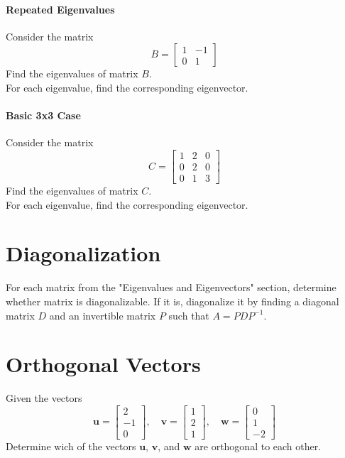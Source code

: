 \documentclass[]{article}
\begin{document}
	\paragraph{Repeated Eigenvalues}
	Consider the matrix
	$$B = \begin{bmatrix}
		1 & -1 \\
		0 & 1
	\end{bmatrix}$$
	Find the eigenvalues of matrix $B$.\\
	For each eigenvalue, find the corresponding eigenvector.
	
	\paragraph{Basic 3x3 Case}
	Consider the matrix
	$$C = \begin{bmatrix}
		1 & 2 & 0 \\
		0 & 2 & 0 \\
		0 & 1 & 3
	\end{bmatrix}$$
	Find the eigenvalues of matrix $C$.\\
	For each eigenvalue, find the corresponding eigenvector.
	
	
	\section{Diagonalization}
	For each matrix from the "Eigenvalues and Eigenvectors" section,  determine whether matrix is diagonalizable.
	If it is, diagonalize it by finding a diagonal matrix $D$ and an invertible matrix $P$ such that $A = PDP^{-1}$.
	
	\section{Orthogonal Vectors}

	Given the vectors
	$$
	\mathbf{u} = \begin{bmatrix}
		2 \\
		-1 \\
		0
	\end{bmatrix}, \quad
	\mathbf{v} = \begin{bmatrix}
		1 \\
		2 \\
		1
	\end{bmatrix}, \quad
	\mathbf{w} = \begin{bmatrix}
		0 \\
		1 \\
		-2
	\end{bmatrix}
	$$
	Determine wich of the vectors $\mathbf{u}$, $\mathbf{v}$, and $\mathbf{w}$ are orthogonal to each other.
	
\end{document}
